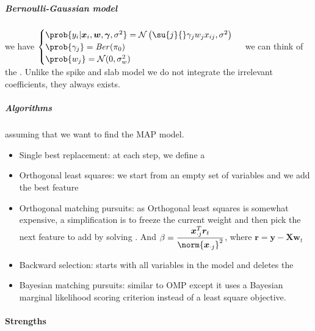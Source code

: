 \subparagraph{Bernoulli-Gaussian model}
we have 
$\begin{cases}
    \prob{y_{i}|\bm{x}_{i},\bm{w}, \bm{\gamma},\sigma^{2}} = \mathcal{N}\left(\su{j}{}
    \gamma_{j}w_{j}x_{ij}, \sigma^{2}\right) \\
    \prob{\gamma_{j}} = \text{\emph{Ber}}(\pi_{0})\\
    \prob{w_{j}} = \mathcal{N}(0, \sigma_{w}^{2})
\end{cases}$
we can think of the . Unlike the
spike and slab model we do not integrate the irrelevant coefficients, they always 
exists.\\
\subparagraph{Algorithms}
assuming that we want to find the MAP model.
\begin{itemize}
    \item Single best replacement: at each step, we define a 
    \item Orthogonal least squares: we start from an empty set of variables and we 
        add the best feature  
    \item Orthogonal matching pursuits: as Orthogonal least squares is somewhat 
        expensive, a simplification is to freeze the current weight and then pick the 
        next feature to add by solving . And
        $\beta = \dfrac{\bm{x}_{\cdot j}^{T}\bm{r}_{t}}{\norm{\bm{x}_{\cdot j}}^{2}}$, where
        $\bm{r} = \bm{y}-\bm{X}\bm{w}_{t}$
    \item Backward selection: starts with all variables in the model and deletes the
    \item Bayesian matching pursuits: similar to OMP except it uses a Bayesian marginal
        likelihood scoring criterion instead of a least square objective.
\end{itemize}

\paragraph{Strengths}
